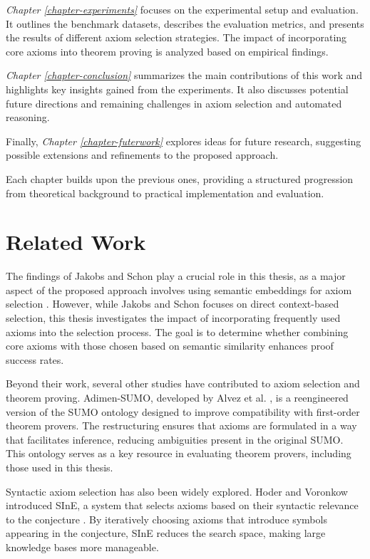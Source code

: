 \documentclass[english,version-2020-11]{uzl-thesis}
\begin{document}
\textit{Chapter \ref{chapter-experiments}} focuses on the experimental setup and evaluation. It outlines the benchmark datasets, describes the evaluation metrics, and presents the results of different axiom selection strategies. The impact of incorporating core axioms into theorem proving is analyzed based on empirical findings.

\textit{Chapter \ref{chapter-conclusion}} summarizes the main contributions of this work and highlights key insights gained from the experiments. It also discusses potential future directions and remaining challenges in axiom selection and automated reasoning.

Finally, \textit{Chapter \ref{chapter-futerwork}} explores ideas for future research, suggesting possible extensions and refinements to the proposed approach.

Each chapter builds upon the previous ones, providing a structured progression from theoretical background to practical implementation and evaluation.


\chapter{Related Work}
\label{chapter-relatedwork}
The findings of Jakobs and Schon play a crucial role in this thesis, as a major aspect of the proposed approach involves using semantic embeddings for axiom selection \cite{Schon2024}.
However, while Jakobs and Schon focuses on direct context-based selection, this thesis investigates the impact of incorporating frequently used axioms into the selection process. The goal is to determine whether combining core axioms with those chosen based on semantic similarity enhances proof success rates.

Beyond their work, several other studies have contributed to axiom selection and theorem proving. Adimen-SUMO, developed by Alvez et al. \cite{Alvez2014}, is a reengineered version of the SUMO ontology designed to improve compatibility with first-order theorem provers. The restructuring ensures that axioms are formulated in a way that facilitates inference, reducing ambiguities present in the original SUMO. This ontology serves as a key resource in evaluating theorem provers, including those used in this thesis.

Syntactic axiom selection has also been widely explored. Hoder and Voronkow introduced SInE, a system that selects axioms based on their syntactic relevance to the conjecture \cite{Hoder2011}. By iteratively choosing axioms that introduce symbols appearing in the conjecture, SInE reduces the search space, making large knowledge bases more manageable.
\end{document}
